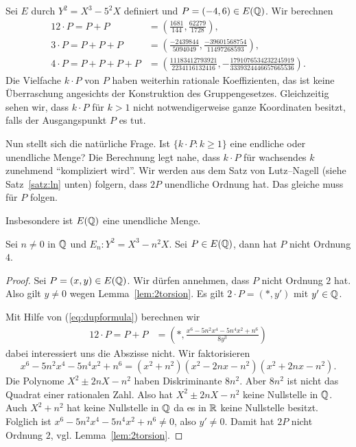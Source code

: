 \begin{beispiel}
  \label{bsp:multiplesofP}
  Sei $E$ durch $Y^2 = X^3-5^2X$ definiert und $P = (-4,6) \in
  E({\mathbb{Q}})$.
  Wir berechnen
  \begin{alignat*}1
    2\cdot P=P+P &= \left(\frac{1681}{144}, \frac{62279}{1728}\right),\\
    3\cdot P=P+P +P &= \left(\frac{-2439844}{5094049}, \frac{-39601568754}{11497268593} \right),\\
    4\cdot P= P+P +P+P &= \left( \frac{11183412793921}{2234116132416}, -\frac{1791076534232245919}{3339324446657665536}\right).
  \end{alignat*}
  Die Vielfache $k\cdot P$ von $P$ haben weiterhin rationale Koeffizienten,
  das ist keine Überraschung angesichts der Konstruktion des
  Gruppengesetzes. Gleichzeitig sehen wir, dass $k\cdot P$ für $k>1$ nicht
  notwendigerweise ganze Koordinaten besitzt, falls der Ausgangspunkt $P$
  es tut.

  Nun stellt sich die natürliche Frage. Ist $\{ k\cdot P : k\ge 1\}$ eine
  endliche oder unendliche Menge? Die Berechnung legt nahe, dass
  $k\cdot P$ für wachsendes $k$ zunehmend ``kompliziert wird''.
  Wir werden aus dem Satz von Lutz--Nagell (siehe Satz~\ref{satz:ln} unten)
  folgern,
  dass $2P$ unendliche
  Ordnung hat. Das gleiche muss für $P$ folgen.

  Insbesondere ist $E({\mathbb{Q}})$ eine unendliche Menge. 
\end{beispiel}

\begin{lemma}
  \label{len:noorder4}
  Sei $n\not=0$ in ${\mathbb{Q}}$ und $E_n:Y^2 = X^3-n^2X$. Sei $P\in E({\mathbb{Q}})$,
  dann hat $P$ nicht Ordnung $4$. 
\end{lemma}
\begin{proof}
  Sei  $P =(x,y)\in E({\mathbb{Q}})$. Wir dürfen annehmen, dass $P$ nicht
  Ordnung $2$ hat. Also gilt $y\not=0$ wegen Lemma~\ref{lem:2torsion}.
  Es gilt  
  $2\cdot P=(*,y')$ mit $y'\in {\mathbb{Q}}$.

  Mit Hilfe von (\ref{eq:dupformula}) berechnen wir
  \begin{alignat*}1
    2\cdot P= P+P %
    &= \left(*, \frac{x^6 - 5n^2x^4 - 5n^4x^2 + n^6}{8y^3}\right)
  \end{alignat*}
  dabei interessiert uns die Abszisse nicht.
  Wir faktorisieren
  $$
  x^6 - 5n^2x^4 - 5n^4x^2 + n^6 = (x^2+n^2)(x^2-2nx-n^2)(x^2+2nx-n^2). 
  $$
  Die Polynome $X^2\pm 2nX-n^2$ haben Diskriminante $8n^2$. Aber
  $8n^2$ ist nicht das Quadrat einer rationalen Zahl. Also hat $X^2\pm
  2nX-n^2$ keine Nullstelle in ${\mathbb{Q}}$. Auch $X^2+n^2$ hat keine
  Nullstelle in ${\mathbb{Q}}$ da es in ${\mathbb{R}}$ keine Nullstelle besitzt. Folglich ist
  $x^6 - 5n^2x^4 - 5n^4x^2 + n^6\not=0$, also $y'\not=0$. Damit hat $2P$ nicht
  Ordnung $2$, vgl. Lemma~\ref{lem:2torsion}. 
\end{proof}


